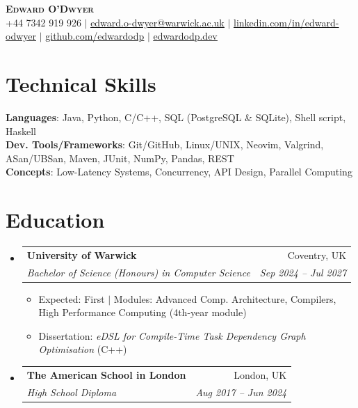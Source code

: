 \documentclass[letterpaper,10pt]{article}
\makeatletter
\newcommand{\resumeItem}[1]{
  \item\small{
    {#1 \vspace{-2pt}}
  }
}
\newcommand{\resumeSubheading}[4]{
  \vspace{-2pt}\item
    \begin{tabular*}{0.97\textwidth}[t]{l@{\extracolsep{\fill}}r}
      \textbf{#1} & #2 \\
      \textit{\small#3} & \textit{\small #4} \\
    \end{tabular*}\vspace{-7pt}
}
\newcommand{\resumeSubHeadingListStart}{\begin{itemize}[leftmargin=0.15in, label={}]}
\newcommand{\resumeSubHeadingListEnd}{\end{itemize}}
\newcommand{\resumeItemListStart}{\begin{itemize}}
\newcommand{\resumeItemListEnd}{\end{itemize}\vspace{-5pt}}
\makeatother
\begin{document}
\small

\begin{center}
    \textbf{\Huge \scshape Edward O'Dwyer} \\ \vspace{1pt}
    \small +44 7342 919 926 $|$ \href{mailto:edward.o-dwyer@warwick.ac.uk}{\underline{edward.o-dwyer@warwick.ac.uk}} $|$
    \href{https://www.linkedin.com/in/edward-odwyer}{\underline{linkedin.com/in/edward-odwyer}} $|$
    \href{https://github.com/edwardodp}{\underline{github.com/edwardodp}} $|$
    \href{https://edwardodp.dev}{\underline{edwardodp.dev}}
\end{center}


\section{Technical Skills}
 \begin{itemize}[leftmargin=0.15in, label={}]
    \small{\item{
     \textbf{Languages}{: Java, Python, C/C++, SQL (PostgreSQL \& SQLite), Shell script, Haskell} \\
     \textbf{Dev. Tools/Frameworks}{: Git/GitHub, Linux/UNIX, Neovim, Valgrind, ASan/UBSan, Maven, JUnit, NumPy, Pandas, REST} \\
     \textbf{Concepts}: Low-Latency Systems, Concurrency, API Design, Parallel Computing
        }
    }
 \end{itemize}

\section{Education}
  \resumeSubHeadingListStart
    \resumeSubheading
      {University of Warwick}{Coventry, UK}
      {Bachelor of Science (Honours) in Computer Science}{Sep 2024 -- Jul 2027}
      \resumeItemListStart
        \resumeItem{Expected: First $|$ Modules: Advanced Comp. Architecture, Compilers, High Performance Computing (4th-year module)}
        \resumeItem{Dissertation: \textit{eDSL for Compile-Time Task Dependency Graph Optimisation} (C++)}
    \resumeItemListEnd
    \resumeSubheading
      {The American School in London}{London, UK}
      {High School Diploma}{Aug 2017 -- Jun 2024}
  \resumeSubHeadingListEnd
\end{document}
